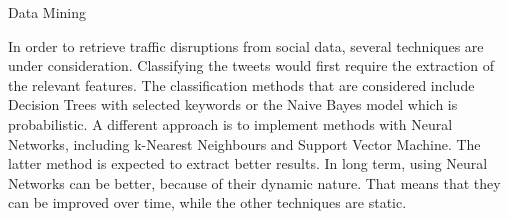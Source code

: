 Data Mining

In order to retrieve traffic disruptions from social data, several techniques are under consideration. Classifying the tweets would first require the extraction of the relevant features. The classification methods that are considered include Decision Trees with selected keywords or the Naive Bayes model which is probabilistic. A different approach is to implement methods with Neural Networks, including k-Nearest Neighbours and Support Vector Machine. The latter method is expected to extract better results. In long term, using Neural Networks can be better, because of their dynamic nature. That means that they can be improved over time, while the other techniques are static.
